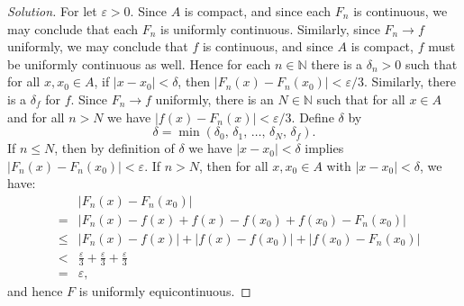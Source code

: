 \documentclass{article}
\theoremstyle{normal}
\begin{document}
        \begin{proof}[Solution]
            For let $\varepsilon>0$. Since $A$ is compact, and since
            each $F_{n}$ is continuous, we may conclude that each $F_{n}$ is
            uniformly continuous. Similarly, since $F_{n}\rightarrow{f}$
            uniformly, we may conclude that $f$ is continuous, and since
            $A$ is compact, $f$ must be uniformly continuous as well.
            Hence for each $n\in\mathbb{N}$ there is a $\delta_{n}>0$ such that
            for all $x,x_{0}\in{A}$, if $|x-x_{0}|<\delta$, then
            $|F_{n}(x)-F_{n}(x_{0})|<\varepsilon/3$. Similarly, there is a
            $\delta_{f}$ for $f$. Since $F_{n}\rightarrow{f}$ uniformly, there
            is an $N\in\mathbb{N}$ such that for all $x\in{A}$ and for all
            $n>N$ we have $|f(x)-F_{n}(x)|<\varepsilon/3$. Define $\delta$
            by
            \begin{equation}
                \delta
                =
                \min\left(
                    \delta_{0},\,
                    \delta_{1},\,
                    \dots,\,
                    \delta_{N},\,
                    \delta_{f}
                \right).
            \end{equation}
            If $n\leq{N}$, then by definition of $\delta$ we have
            $|x-x_{0}|<\delta$ implies
            $|F_{n}(x)-F_{n}(x_{0})|<\varepsilon$. If $n>N$, then for all
            $x,x_{0}\in{A}$ with $|x-x_{0}|<\delta$, we have:
            \begin{equation}
                \begin{array}{rcl}
                    &&
                    \!\!
                    \displaystyle
                    |F_{n}(x)-F_{n}(x_{0})|\\[1em]
                    \!\!
                    &=&
                    \!\!
                    \displaystyle
                    |F_{n}(x)-f(x)+f(x)-f(x_{0})+f(x_{0})-F_{n}(x_{0})|\\[1em]
                    \!\!
                    &\leq&
                    \!\!
                    \displaystyle
                    |F_{n}(x)-f(x)|
                    +
                    |f(x)-f(x_{0})|
                    +
                    |f(x_{0})-F_{n}(x_{0})|\\[1em]
                    \!\!
                    &<&
                    \!\!
                    \displaystyle
                    \frac{\varepsilon}{3}
                    +
                    \frac{\varepsilon}{3}
                    +
                    \frac{\varepsilon}{3}\\[1em]
                    \!\!
                    &=&
                    \!\!
                    \varepsilon,
                \end{array}
            \end{equation}
            and hence $F$ is uniformly equicontinuous.
        \end{proof}
\end{document}

